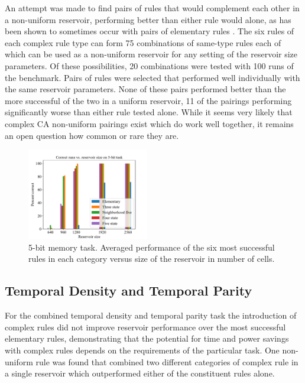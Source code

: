 \documentclass{elsarticle}
\begin{document}
\begin{multicols}{2}
	An attempt was made to find pairs of rules that would complement each other in 
	a non-uniform reservoir, performing better than either rule would alone, as has 
	been shown to sometimes occur with pairs of elementary rules 
	\cite{nichele2017reservoir}. The six rules of each complex rule type can form 
	75 combinations of same-type rules each of which can be used as a non-uniform 
	reservoir for  any setting of the reservoir size parameters. Of these 
	possibilities, 20 combinations were tested with 100 runs of the benchmark.  
	Pairs of rules were selected that performed well individually with the same 
        reservoir parameters.  None of these pairs performed better than the 
        more successful of the two in a uniform reservoir, 11 of the pairings 
        performing significantly worse than either rule tested alone.  While it 
        seems very likely that complex CA non-uniform pairings exist which do 
        work well together, it remains an open question how common or rare they 
        are.
	

        \begin{figure}[H]
                \centering
                \includegraphics[width=0.475\textwidth]{bar.pdf}
                \caption{5-bit memory task. Averaged performance of the six 
                   most successful rules in each category versus size of the 
                      reservoir in number of cells. }
                \label{figure:bar_graph}
        \end{figure}
	
        \subsection{Temporal Density and Temporal Parity}
	For the combined temporal density and temporal parity task the introduction of 
	complex rules did not improve reservoir performance over the most successful 
	elementary rules, demonstrating that the potential for time and power savings 
	with complex rules depends on the requirements of the particular task. One 
	non-uniform rule was found that combined two different categories of complex 
	rule in a single reservoir which outperformed either of the constituent rules 
	alone.
	

\end{multicols}
\end{document}
